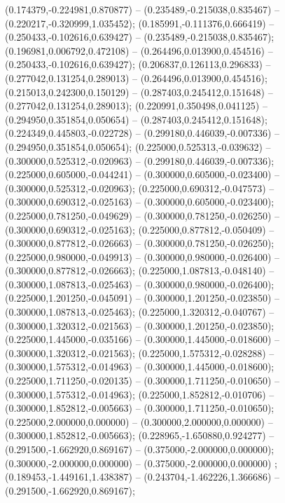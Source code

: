  (0.174379,-0.224981,0.870877) -- (0.235489,-0.215038,0.835467) -- (0.220217,-0.320999,1.035452);
 (0.185991,-0.111376,0.666419) -- (0.250433,-0.102616,0.639427) -- (0.235489,-0.215038,0.835467);
 (0.196981,0.006792,0.472108) -- (0.264496,0.013900,0.454516) -- (0.250433,-0.102616,0.639427);
 (0.206837,0.126113,0.296833) -- (0.277042,0.131254,0.289013) -- (0.264496,0.013900,0.454516);
 (0.215013,0.242300,0.150129) -- (0.287403,0.245412,0.151648) -- (0.277042,0.131254,0.289013);
 (0.220991,0.350498,0.041125) -- (0.294950,0.351854,0.050654) -- (0.287403,0.245412,0.151648);
 (0.224349,0.445803,-0.022728) -- (0.299180,0.446039,-0.007336) -- (0.294950,0.351854,0.050654);
 (0.225000,0.525313,-0.039632) -- (0.300000,0.525312,-0.020963) -- (0.299180,0.446039,-0.007336);
 (0.225000,0.605000,-0.044241) -- (0.300000,0.605000,-0.023400) -- (0.300000,0.525312,-0.020963);
 (0.225000,0.690312,-0.047573) -- (0.300000,0.690312,-0.025163) -- (0.300000,0.605000,-0.023400);
 (0.225000,0.781250,-0.049629) -- (0.300000,0.781250,-0.026250) -- (0.300000,0.690312,-0.025163);
 (0.225000,0.877812,-0.050409) -- (0.300000,0.877812,-0.026663) -- (0.300000,0.781250,-0.026250);
 (0.225000,0.980000,-0.049913) -- (0.300000,0.980000,-0.026400) -- (0.300000,0.877812,-0.026663);
 (0.225000,1.087813,-0.048140) -- (0.300000,1.087813,-0.025463) -- (0.300000,0.980000,-0.026400);
 (0.225000,1.201250,-0.045091) -- (0.300000,1.201250,-0.023850) -- (0.300000,1.087813,-0.025463);
 (0.225000,1.320312,-0.040767) -- (0.300000,1.320312,-0.021563) -- (0.300000,1.201250,-0.023850);
 (0.225000,1.445000,-0.035166) -- (0.300000,1.445000,-0.018600) -- (0.300000,1.320312,-0.021563);
 (0.225000,1.575312,-0.028288) -- (0.300000,1.575312,-0.014963) -- (0.300000,1.445000,-0.018600);
 (0.225000,1.711250,-0.020135) -- (0.300000,1.711250,-0.010650) -- (0.300000,1.575312,-0.014963);
 (0.225000,1.852812,-0.010706) -- (0.300000,1.852812,-0.005663) -- (0.300000,1.711250,-0.010650);
 (0.225000,2.000000,0.000000) -- (0.300000,2.000000,0.000000) -- (0.300000,1.852812,-0.005663);
 (0.228965,-1.650880,0.924277) -- (0.291500,-1.662920,0.869167) -- (0.375000,-2.000000,0.000000);
 (0.300000,-2.000000,0.000000) -- (0.375000,-2.000000,0.000000) ;
 (0.189453,-1.449161,1.438387) -- (0.243704,-1.462226,1.366686) -- (0.291500,-1.662920,0.869167);
